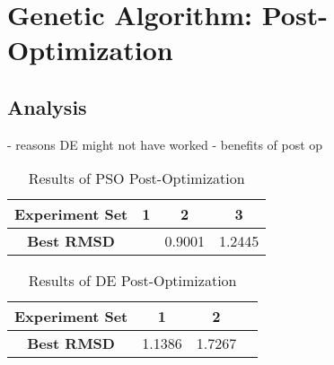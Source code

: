 \section{Genetic Algorithm: Post-Optimization}

\subsection{Analysis}

- reasons DE might not have worked
- benefits of post op

\begin{table}
	\label{table:post-op-pso-results}
	\centering
	\begin{tabular}{ | >{\bfseries}c | c | c | c | }
		\hline
		Experiment Set & 1 & 2 & 3 \\ \hline
		Best RMSD &  & 0.9001 & 1.2445 \\ \hline
	\end{tabular}
	\caption{Results of PSO Post-Optimization}
\end{table}

\begin{table}
	\label{table:post-op-de-results}
	\centering
	\begin{tabular}{ | >{\bfseries}c | c | c | c | }
		\hline
		Experiment Set & 1 & 2 \\ \hline
		Best RMSD & 1.1386 &1.7267  \\ \hline
	\end{tabular}
	\caption{Results of DE Post-Optimization}
\end{table}